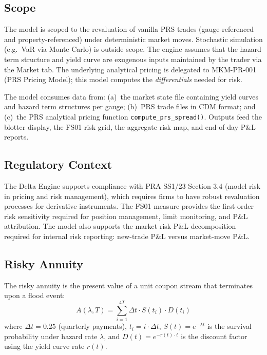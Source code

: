 \documentclass[11pt,a4paper]{article}
\begin{document}
\subsection{Scope}

The model is scoped to the revaluation of vanilla PRS trades (gauge-referenced and property-referenced) under deterministic market moves. Stochastic simulation (e.g.\ VaR via Monte Carlo) is outside scope. The engine assumes that the hazard term structure and yield curve are exogenous inputs maintained by the trader via the Market tab. The underlying analytical pricing is delegated to MKM-PR-001 (PRS Pricing Model); this model computes the \emph{differentials} needed for risk.

The model consumes data from: (a)~the market state file containing yield curves and hazard term structures per gauge; (b)~PRS trade files in CDM format; and (c)~the PRS analytical pricing function \texttt{compute\_prs\_spread()}. Outputs feed the blotter display, the FS01 risk grid, the aggregate risk map, and end-of-day P\&L reports.

\subsection{Regulatory Context}

The Delta Engine supports compliance with PRA SS1/23 Section 3.4 (model risk in pricing and risk management), which requires firms to have robust revaluation processes for derivative instruments. The FS01 measure provides the first-order risk sensitivity required for position management, limit monitoring, and P\&L attribution. The model also supports the market risk P\&L decomposition required for internal risk reporting: new-trade P\&L versus market-move P\&L.

\clearpage

\mkmframework

\subsection{Risky Annuity}

The risky annuity is the present value of a unit coupon stream that terminates upon a flood event:
\begin{equation}
    A(\lambda, T) = \sum_{i=1}^{4T} \Delta t \cdot S(t_i) \cdot D(t_i)
\end{equation}
where $\Delta t = 0.25$ (quarterly payments), $t_i = i \cdot \Delta t$, $S(t) = e^{-\lambda t}$ is the survival probability under hazard rate $\lambda$, and $D(t) = e^{-r(t) \cdot t}$ is the discount factor using the yield curve rate $r(t)$.
\end{document}
